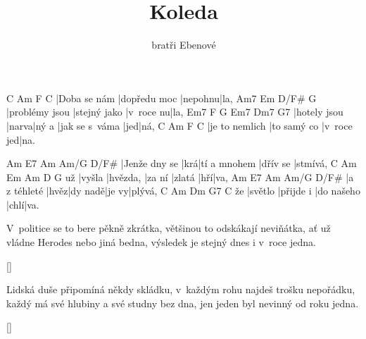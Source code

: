 \documentclass{song}
\author{bratři Ebenové}
\title{Koleda}
\begin{document}
\strophe
C            Am           F       C
|Doba se nám |dopředu moc |nepohnu|la,
Am7            Em           D/F#     G
|problémy jsou |stejný jako |v~roce nu|la,
Em7          F     G     Em7            Dm7 G7
|hotely jsou |narva|ný a |jak se s~váma |jed|ná,
C              Am          F          C
|je to nemlich |to samý co |v~roce jed|na.
\endstrophe

Am            E7  Am           Am/G     D/F#
|Jenže dny se |krá|tí a mnohem |dřív se |stmívá,
   C      Am       Em     Am     D   G
už |vyšla |hvězda, |za ní |zlatá |hří|va,
Am           E7   Am      Am/G  D/F#
|a z téhleté |hvěz|dy nadě|je vy|plývá,
   C       Am        Dm         G7   C
že |světlo |přijde i |do našeho |chlí|va.
\endstrophe

\strophe*
V~politice se to bere pěkně zkrátka,
většinou to odskákají neviňátka,
ať už vládne Herodes nebo jiná bedna,
výsledek je stejný dnes i v~roce jedna.
\endstrophe

\ref{}

\strophe*
Lidská duše připomíná někdy skládku,
v~každým rohu najdeš trošku nepořádku,
každý má své hlubiny a své studny bez dna,
jen jeden byl nevinný od roku jedna.
\endstrophe

\ref{}
\end{document}
